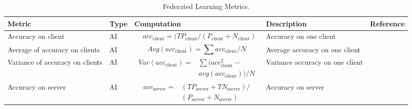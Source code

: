 \begin{table}[ht]
\caption{Federated Learning Metrics.} 
\label{tab:fl}
\begin{tabular}{|p{3cm}|l|p{6cm}|p{3cm}|p{1.5cm}|}

\hline
Metric                 & Type      & Computation & Description                                                                & Reference \\ \hline
Accuracy on client
& AI 
& 
\parbox{3cm}{
    \begin{equation} \label{equ:aoc} 
    \begin{split}
& acc_{\text{client}} = (TP_{\text{client}} 
 / (P_{\text{client}} + N_{\text{client}})
    \end{split} 
    \end{equation} 
}
& Accuracy on one client 
& \cite{DBLP:conf/iclr/LiSBS20}       
\\ \hline

Average of accuracy on clients
& AI
&
\parbox{3cm}{
    \begin{equation} \label{equ:aoaoc} 
    Avg(acc_{\text{client}}) = \sum acc_{\text{client}} / N
    \end{equation}
}
& Average accuracy on one client 
& \cite{DBLP:conf/iclr/LiSBS20}       
\\ \hline

Variance of accuracy on clients
& AI
&
\parbox{3cm}{
    \begin{equation} \label{equ:voaoc} 
    \begin{split}
    Var(acc_{\text{client}}) =
    & \sum (acc_{\text{client}}^2 - \\ 
    & avg(acc_{\text{client}})) / N
    \end{split}
    \end{equation}
}
& Variance accuracy on one client 
& \cite{DBLP:conf/iclr/LiSBS20}       
\\ \hline

Accuracy on server
& AI
&
\parbox{3cm}{
    \begin{equation} \label{equ:aos} 
    \begin{split}
acc_{\text{server}} = 
& (TP_{\text{server}} + TN_{\text{server}}) / \\
& (P_{\text{server}} + N_{\text{server}} )
    \end{split}
    \end{equation}
}
& 
Accuracy on server
& \cite{DBLP:conf/aistats/McMahanMRHA17}
\\ \hline


\end{tabular}
\end{table}
